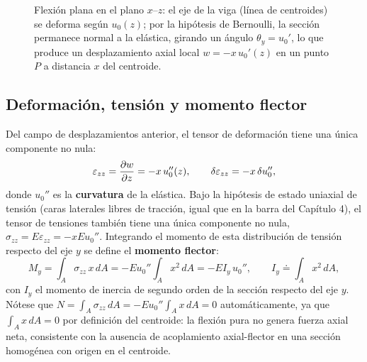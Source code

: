 \begin{figure}[htbp]
\centering
{}
\caption{Flexión plana en el plano $x$--$z$: el eje de la viga (línea de centroides) se deforma según $u_0(z)$; por la hipótesis de Bernoulli, la sección permanece normal a la elástica, girando un ángulo $\theta_y=u_0'$, lo que produce un desplazamiento axial local $w=-x\,u_0'(z)$ en un punto $P$ a distancia $x$ del centroide.}
\label{fig:cap09-viga-flexion-xz}
\end{figure}

\subsection{Deformación, tensión y momento flector}

Del campo de desplazamientos anterior, el tensor de deformación tiene una única componente no nula:
\[
\varepsilon_{zz} = \pdv{w}{z} = -x\,u_0''(z) , \qquad \delta\varepsilon_{zz}=-x\,\delta u_0'' ,
\]
donde $u_0''$ es la \textbf{curvatura} de la elástica. Bajo la hipótesis de estado uniaxial de tensión (caras laterales libres de tracción, igual que en la barra del Capítulo 4), el tensor de tensiones también tiene una única componente no nula, $\sigma_{zz}=E\varepsilon_{zz}=-xEu_0''$. Integrando el momento de esta distribución de tensión respecto del eje $y$ se define el \textbf{momento flector}:
\[
M_y = \int_A \sigma_{zz}\,x\,dA = -Eu_0''\int_A x^2\,dA = -EI_y\,u_0'' , \qquad I_y \doteq \int_A x^2\,dA ,
\]
con $I_y$ el momento de inercia de segundo orden de la sección respecto del eje $y$. Nótese que $N=\int_A\sigma_{zz}\,dA=-Eu_0''\int_A x\,dA=0$ automáticamente, ya que $\int_A x\,dA=0$ por definición del centroide: la flexión pura no genera fuerza axial neta, consistente con la ausencia de acoplamiento axial-flector en una sección homogénea con origen en el centroide.

